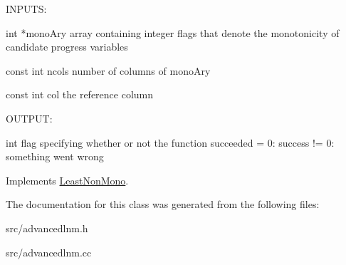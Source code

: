 \begin{DoxyVerb}
INPUTS:

int *monoAry     array containing integer flags that denote the monotonicity of candidate progress variables

const int ncols  number of columns of monoAry

const int col    the reference column 

OUTPUT:

int              flag specifying whether or not the function succeeded
                  = 0: success
		 != 0: something went wrong


\end{DoxyVerb}
 

Implements \hyperlink{classLeastNonMono_a239cbd7836950dc7c758138c4db00d0c}{LeastNonMono}.



The documentation for this class was generated from the following files:\begin{DoxyCompactItemize}
\item 
src/advancedlnm.h\item 
src/advancedlnm.cc\end{DoxyCompactItemize}

